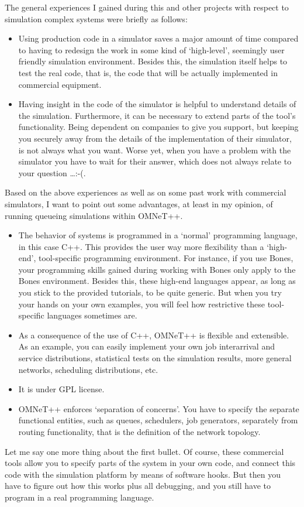 \documentclass[a4paper]{article}
\begin{document}
The general experiences I gained during this and other projects with
respect to simulation complex systems were briefly as follows:
\begin{itemize}
\item Using production code in a simulator saves a major amount of
  time compared to having to redesign the work in some kind of
  `high-level', seemingly user friendly simulation environment.
  Besides this, the simulation itself helps to test the real code,
  that is, the code that will be actually  implemented in commercial
  equipment.
\item Having insight in the code of the simulator is
  helpful to understand details of the simulation. Furthermore, it can
  be necessary to extend parts of the tool's functionality. Being
  dependent on companies to give you support, but keeping you securely
  away from the details of the implementation of their simulator, is
  not always what you want. Worse yet, when you have a problem with the
  simulator you have to wait for their answer, which does not always
  relate to your question \ldots :-(.
\end{itemize}
Based on the above experiences as well as on some past work with
commercial simulators, I want to point out some advantages, at least
in my opinion, of running queueing simulations within OMNeT++.
\begin{itemize}
\item The behavior of  systems is programmed in a `normal'
  programming language, in this case C++. This provides the user way
  more flexibility than a `high-end', tool-specific programming
  environment. For instance, if you use Bones, your programming skills
  gained during working with Bones only apply to the Bones
  environment. Besides this, these high-end languages appear, as long
  as you stick to the provided tutorials, to be quite generic. But
  when you try your hands on your own examples,  you will feel how
  restrictive these tool-specific languages sometimes  are.
\item As a consequence of the use of C++, OMNeT++ is flexible and
  extensible. As an example, you can easily implement your own job
  interarrival and service distributions, statistical tests on the
  simulation results, more general networks, scheduling distributions,
  etc.
\item It is under GPL license.
\item OMNeT++ enforces `separation of concerns'. You have to specify
  the separate functional entities, such as queues, schedulers, job
  generators, separately from routing functionality, that is the
  definition of the network topology.
\end{itemize}
Let me say one more thing about the first bullet. Of course, these
commercial tools allow you to specify parts of the system in your own
code, and connect this code with the simulation platform by means of
software hooks.  But then you have to figure out how this works plus
all debugging, and you still have to program in a real programming
language.
\end{document}
